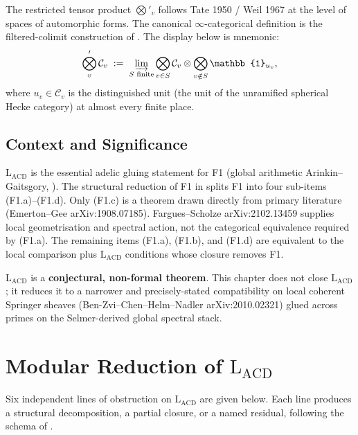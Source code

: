The restricted tensor product \(\bigotimes'_{v}\) follows Tate 1950 /
Weil 1967 at the level of spaces of automorphic forms. The canonical
\(\infty\)-categorical definition is the filtered-colimit construction
of . The display below is
mnemonic:
\begin{equation}
\label{v4-arith:acd:eq:restricted-tp}
\bigotimes_{v}^{\prime}\mathcal{C}_{v}
\;:=\;
\varinjlim_{S\text{ finite}}
\bigotimes_{v\in S}\mathcal{C}_{v}\otimes\bigotimes_{v\notin S}\mathbb{1}_{u_{v}},
\end{equation}
where \(u_{v}\in\mathcal{C}_{v}\) is the distinguished unit
(the unit of the unramified spherical Hecke category) at almost every
finite place.

\subsection{Context and Significance}

\(\mathrm{L}_{\mathrm{ACD}}\) is the essential adelic gluing
statement for F1 (global arithmetic Arinkin--Gaitsgory,
). The structural reduction of F1
in  splits F1 into four sub-items
 (F1.a)--(F1.d). Only (F1.c) is a theorem drawn directly from
 primary literature (Emerton--Gee arXiv:1908.07185). Fargues--Scholze
 arXiv:2102.13459 supplies local geometrisation and spectral action,
 not the categorical equivalence required by (F1.a). The remaining
 items (F1.a), (F1.b), and (F1.d) are equivalent to the local
comparison plus \(\mathrm{L}_{\mathrm{ACD}}\) conditions whose
closure removes F1.

\(\mathrm{L}_{\mathrm{ACD}}\) is a
\textbf{conjectural, non-formal theorem}. This chapter does not
close \(\mathrm{L}_{\mathrm{ACD}}\); it reduces it to a narrower and
precisely-stated compatibility on local coherent Springer sheaves
(Ben-Zvi--Chen--Helm--Nadler arXiv:2010.02321) glued across primes
on the Selmer-derived global spectral stack.

\section{Modular Reduction of \(\mathrm{L}_{\mathrm{ACD}}\)}
\label{v4-arith:acd:obstruction-analysis}

Six independent lines of obstruction on \(\mathrm{L}_{\mathrm{ACD}}\) are
given below. Each line produces a structural decomposition, a partial
closure, or a named residual, following the schema of
.

